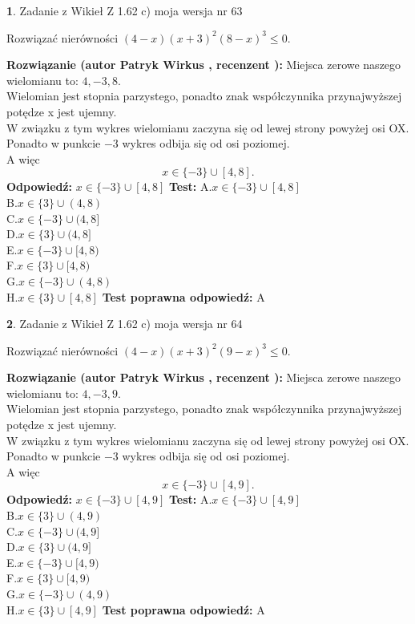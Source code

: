 \documentclass[12pt, a4paper]{article}
\theoremstyle{definition} %
\newtheorem{zad}{}
\newcommand{\zadStart}[1]{\begin{zad}#1\newline}
\newcommand{\zadStop}{\end{zad}}
\newcommand{\rozwStart}[2]{\noindent \textbf{Rozwiązanie (autor #1 , recenzent #2): }\newline}
\newcommand{\rozwStop}{\newline}
\newcommand{\odpStart}{\noindent \textbf{Odpowiedź:}\newline}
\newcommand{\odpStop}{\newline}
\newcommand{\testStart}{\noindent \textbf{Test:}\newline}
\newcommand{\testStop}{\newline}
\newcommand{\kluczStart}{\noindent \textbf{Test poprawna odpowiedź:}\newline}
\newcommand{\kluczStop}{\newline}
\begin{document}
\zadStart{Zadanie z Wikieł Z 1.62 c) moja wersja nr 63}

Rozwiązać nierówności $(4-x)(x+3)^{2}(8-x)^{3}\le0$.
\zadStop
\rozwStart{Patryk Wirkus}{}
Miejsca zerowe naszego wielomianu to: $4, -3, 8$.\\
Wielomian jest stopnia parzystego, ponadto znak współczynnika przy\linebreak najwyższej potędze x jest ujemny.\\ W związku z tym wykres wielomianu zaczyna się od lewej strony powyżej osi OX.\\
Ponadto w punkcie $-3$ wykres odbija się od osi poziomej.\\
A więc $$x \in \{-3\} \cup [4,8].$$
\rozwStop
\odpStart
$x \in \{-3\} \cup [4,8]$
\odpStop
\testStart
A.$x \in \{-3\} \cup [4,8]$\\
B.$x \in \{3\} \cup (4,8)$\\
C.$x \in \{-3\} \cup (4,8]$\\
D.$x \in \{3\} \cup (4,8]$\\
E.$x \in \{-3\} \cup [4,8)$\\
F.$x \in \{3\} \cup [4,8)$\\
G.$x \in \{-3\} \cup (4,8)$\\
H.$x \in \{3\} \cup [4,8]$
\testStop
\kluczStart
A
\kluczStop



\zadStart{Zadanie z Wikieł Z 1.62 c) moja wersja nr 64}

Rozwiązać nierówności $(4-x)(x+3)^{2}(9-x)^{3}\le0$.
\zadStop
\rozwStart{Patryk Wirkus}{}
Miejsca zerowe naszego wielomianu to: $4, -3, 9$.\\
Wielomian jest stopnia parzystego, ponadto znak współczynnika przy\linebreak najwyższej potędze x jest ujemny.\\ W związku z tym wykres wielomianu zaczyna się od lewej strony powyżej osi OX.\\
Ponadto w punkcie $-3$ wykres odbija się od osi poziomej.\\
A więc $$x \in \{-3\} \cup [4,9].$$
\rozwStop
\odpStart
$x \in \{-3\} \cup [4,9]$
\odpStop
\testStart
A.$x \in \{-3\} \cup [4,9]$\\
B.$x \in \{3\} \cup (4,9)$\\
C.$x \in \{-3\} \cup (4,9]$\\
D.$x \in \{3\} \cup (4,9]$\\
E.$x \in \{-3\} \cup [4,9)$\\
F.$x \in \{3\} \cup [4,9)$\\
G.$x \in \{-3\} \cup (4,9)$\\
H.$x \in \{3\} \cup [4,9]$
\testStop
\kluczStart
A
\kluczStop
\end{document}
